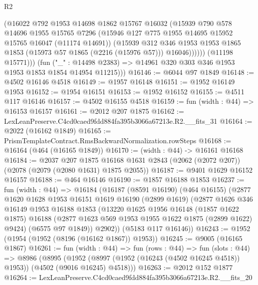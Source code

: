\begin{lexlean}{R2}
\begin{coremodule}
                  (@16022
                    @792
                    @1953
                    @14698
                    @1862
                    @15767
                    @16032
                    (@15939
                      @790
                      @578
                      @14696
                      @1955
                      @15765
                      @7296
                      (@15946 @127 @775 @1955 @14695 @15952 @15765 @16047 (@11174 @14691))
                      (@15939
                        @312
                        @346
                        @1953
                        @1953
                        @1865
                        @1853
                        (@15973 @57 @1865 (@2216 (@15976 @57)))
                        @16046))))))
            (@11198 @15771)))
        (fun ("_" : @14498 @2383) => @14961 @320 @303 @346 @1953 @1953 @1853 @1854 @14954 @11215)))
@16146 := @6044 @97 @1849
@16148 := @4502 @16146 @4518
@16149 := @1957 @16148
@16151 := @1952 @16149 @1953
@16152 := @1954 @16151
@16153 := @1952 @16152
@16155 := @4511 @117 @16146
@16157 := @4502 @16155 @4518
@16159 := fun (width : @44) => @16153 @16157
@16161 := @2012 @207 @1875
@16162 := LexLeanPreserve.C4cd0caed9fdd884fa395b3066a67213e.R2.__fits_31
@16164 := @2022 (@16162 @1849)
@16165 := PrismTemplateContract.RmsBackwardNormalization.rowSteps
@16168 := @16164 (@464 (@16165 @1849))
@16170 := (width : @44) -> @16161 @16168
@16184 := @2037
    @207
    @1875
    @16168
    @1631
    @2843
    (@2062 (@2072 @207))
    (@2078 (@2079 (@2080 @1631) @1875 @2055))
@16187 := @9401 @1629 @16152 @16157
@16188 := @464 @16146
@16190 := @1857 @16188 @1853
@16237 := fun (width : @44) =>
  @16184
    (@16187
      (@8591 @16190)
      (@464 @16155)
      (@2877
        @1620
        @1628
        @1953
        @16151
        @1619
        @16190
        (@2899 @1619)
        (@2877
          @1626
          @346
          @16149
          @1953
          @16188
          @1853
          (@13220
            @1625
            @1956
            @16148
            (@1857 @1622 @1875)
            @16188
            (@2877 @1623 @569 @1953 @1955 @1622 @1875 (@2899 @1622) @9424)
            (@6575 @97 @1849))
          @2902))
      (@5183 @117 @16146))
@16243 := @1952 (@1954 (@1952 (@8196 (@16162 @1867)) @1953))
@16245 := @9005 (@16165 @1867)
@16261 := fun (width : @44) =>
  fun (rows : @44) =>
  fun (slots : @44) =>
  @8986
    (@8995 (@1952 (@8997 (@1952 (@16243 (@4502 @16245 @4518)) @1953)) (@4502 (@9016 @16245) @4518)))
@16263 := @2012 @152 @1877
@16264 := LexLeanPreserve.C4cd0caed9fdd884fa395b3066a67213e.R2.__fits_20

\end{coremodule}
\end{lexlean}
